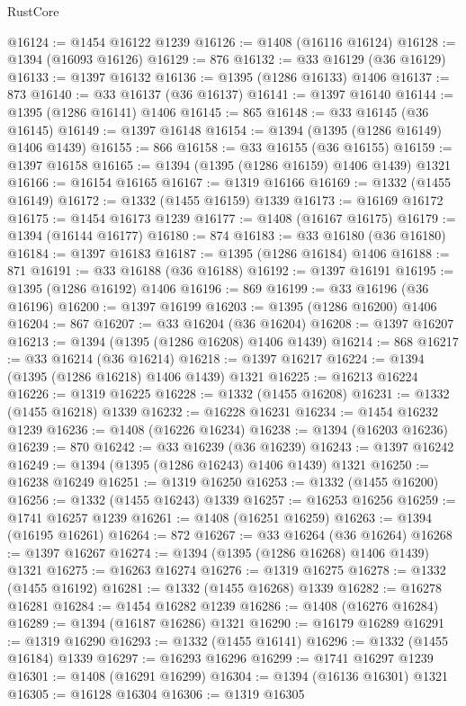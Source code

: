 \begin{lexlean}{RustCore}
\begin{coremodule}
@16124 := @1454 @16122 @1239
@16126 := @1408 (@16116 @16124)
@16128 := @1394 (@16093 @16126)
@16129 := 876
@16132 := @33 @16129 (@36 @16129)
@16133 := @1397 @16132
@16136 := @1395 (@1286 @16133) @1406
@16137 := 873
@16140 := @33 @16137 (@36 @16137)
@16141 := @1397 @16140
@16144 := @1395 (@1286 @16141) @1406
@16145 := 865
@16148 := @33 @16145 (@36 @16145)
@16149 := @1397 @16148
@16154 := @1394 (@1395 (@1286 @16149) @1406 @1439)
@16155 := 866
@16158 := @33 @16155 (@36 @16155)
@16159 := @1397 @16158
@16165 := @1394 (@1395 (@1286 @16159) @1406 @1439) @1321
@16166 := @16154 @16165
@16167 := @1319 @16166
@16169 := @1332 (@1455 @16149)
@16172 := @1332 (@1455 @16159) @1339
@16173 := @16169 @16172
@16175 := @1454 @16173 @1239
@16177 := @1408 (@16167 @16175)
@16179 := @1394 (@16144 @16177)
@16180 := 874
@16183 := @33 @16180 (@36 @16180)
@16184 := @1397 @16183
@16187 := @1395 (@1286 @16184) @1406
@16188 := 871
@16191 := @33 @16188 (@36 @16188)
@16192 := @1397 @16191
@16195 := @1395 (@1286 @16192) @1406
@16196 := 869
@16199 := @33 @16196 (@36 @16196)
@16200 := @1397 @16199
@16203 := @1395 (@1286 @16200) @1406
@16204 := 867
@16207 := @33 @16204 (@36 @16204)
@16208 := @1397 @16207
@16213 := @1394 (@1395 (@1286 @16208) @1406 @1439)
@16214 := 868
@16217 := @33 @16214 (@36 @16214)
@16218 := @1397 @16217
@16224 := @1394 (@1395 (@1286 @16218) @1406 @1439) @1321
@16225 := @16213 @16224
@16226 := @1319 @16225
@16228 := @1332 (@1455 @16208)
@16231 := @1332 (@1455 @16218) @1339
@16232 := @16228 @16231
@16234 := @1454 @16232 @1239
@16236 := @1408 (@16226 @16234)
@16238 := @1394 (@16203 @16236)
@16239 := 870
@16242 := @33 @16239 (@36 @16239)
@16243 := @1397 @16242
@16249 := @1394 (@1395 (@1286 @16243) @1406 @1439) @1321
@16250 := @16238 @16249
@16251 := @1319 @16250
@16253 := @1332 (@1455 @16200)
@16256 := @1332 (@1455 @16243) @1339
@16257 := @16253 @16256
@16259 := @1741 @16257 @1239
@16261 := @1408 (@16251 @16259)
@16263 := @1394 (@16195 @16261)
@16264 := 872
@16267 := @33 @16264 (@36 @16264)
@16268 := @1397 @16267
@16274 := @1394 (@1395 (@1286 @16268) @1406 @1439) @1321
@16275 := @16263 @16274
@16276 := @1319 @16275
@16278 := @1332 (@1455 @16192)
@16281 := @1332 (@1455 @16268) @1339
@16282 := @16278 @16281
@16284 := @1454 @16282 @1239
@16286 := @1408 (@16276 @16284)
@16289 := @1394 (@16187 @16286) @1321
@16290 := @16179 @16289
@16291 := @1319 @16290
@16293 := @1332 (@1455 @16141)
@16296 := @1332 (@1455 @16184) @1339
@16297 := @16293 @16296
@16299 := @1741 @16297 @1239
@16301 := @1408 (@16291 @16299)
@16304 := @1394 (@16136 @16301) @1321
@16305 := @16128 @16304
@16306 := @1319 @16305

\end{coremodule}
\end{lexlean}
